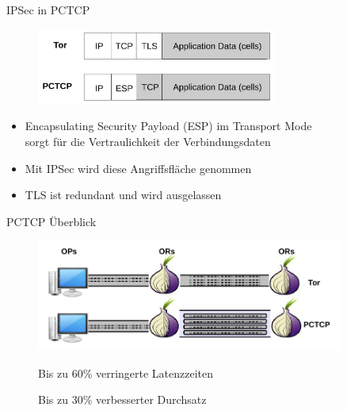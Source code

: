 \documentclass{beamer}
\begin{document}
\begin{frame}{IPSec in PCTCP}{\secname}
  \begin{figure}[h]
    \begin{center}
      \includegraphics[width=0.7\textwidth]{pics/PCTCP_header.pdf}
    \end{center}
  \end{figure}
  \begin{itemize}
    \item Encapsulating Security Payload (ESP) im Transport Mode \\
          sorgt für die Vertraulichkeit der Verbindungsdaten
    \item Mit IPSec wird diese Angriffsfläche genommen
    \item TLS ist redundant und wird ausgelassen
  \end{itemize}
\end{frame}


\begin{frame}{PCTCP Überblick}{\secname}
  \begin{figure}
    \begin{center}
      \includegraphics[width=0.9\textwidth]{pics/PCTCP_design.pdf}
    \end{center}
  \begin{itemize}
   {
        \item Bis zu 60\% verringerte Latenzzeiten
        \item Bis zu 30\% verbesserter Durchsatz
    
   }
  \end{itemize}
  \end{figure} 
\end{frame}
\end{document}
